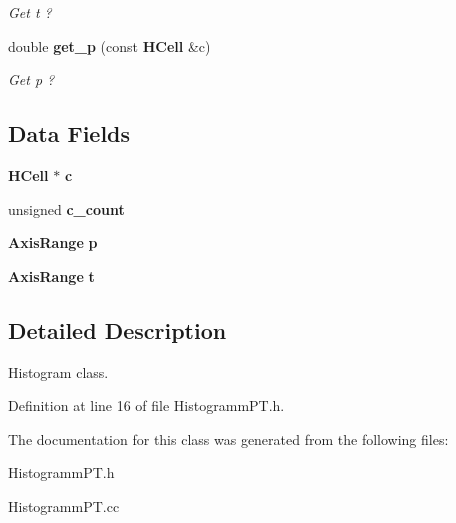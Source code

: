 \begin{DoxyCompactItemize}
\begin{DoxyCompactList}\small\item\em Get t ? \end{DoxyCompactList}\item 
double {\bf get\-\_\-p} (const {\bf H\-Cell} \&c)\label{classHistogrammPT_ac979daa0f17d147c523e2e927617738e}

\begin{DoxyCompactList}\small\item\em Get p ? \end{DoxyCompactList}\end{DoxyCompactItemize}
\subsection*{Data Fields}
\begin{DoxyCompactItemize}
\item 
{\bf H\-Cell} $\ast$ {\bfseries c}\label{classHistogrammPT_a7ef98513afbbef61a4a764082dec2dc2}

\item 
unsigned {\bfseries c\-\_\-count}\label{classHistogrammPT_a253cf428378cf4d9b11aac5344a4e5ed}

\item 
{\bf Axis\-Range} {\bfseries p}\label{classHistogrammPT_a785c1c78da66f092a60351a39e9661bb}

\item 
{\bf Axis\-Range} {\bfseries t}\label{classHistogrammPT_a35d3ffa3da74524aeb263212286d2988}

\end{DoxyCompactItemize}


\subsection{Detailed Description}
Histogram class. 

Definition at line 16 of file Histogramm\-P\-T.\-h.



The documentation for this class was generated from the following files\-:\begin{DoxyCompactItemize}
\item 
Histogramm\-P\-T.\-h\item 
Histogramm\-P\-T.\-cc\end{DoxyCompactItemize}

